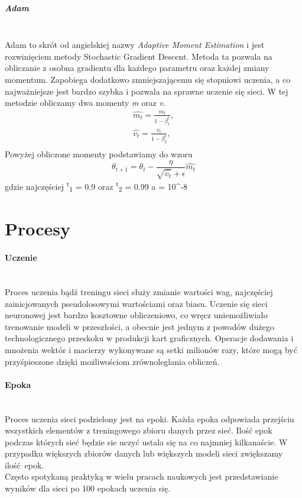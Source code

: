 \subparagraph{Adam} \mbox{}\\
Adam to skrót od angielskiej nazwy \textit{Adaptive Moment Estimation} i jest rozwinięciem
metody Stochastic Gradient Descent. Metoda ta pozwala na obliczanie z osobna gradientu dla
każdego parametru oraz każdej zmiany momentum. Zapobiega dodatkowo zmniejszającemu się
stopniowi uczenia, a co najważniejsze jest bardzo szybka i pozwala na sprawne uczenie
się sieci. W tej metodzie obliczamy dwa momenty \textit{m} oraz \textit{v}.
\begin{equation}
\begin{align*}
\hat{m_t} = \frac{m_t} {1 - \beta^t_1}, \\
\hat{v_t} = \frac{v_t} {1 - \beta^t_2}, \\
\end{align*}
\end{equation}
Powyżej obliczone momenty podstawiamy do wzoru
\begin{equation}
\theta_{t+1} = \theta_t - \frac {\eta} {\sqrt{\hat{v_t}} + \epsilon} \hat{m_t}
\end{equation}
gdzie najczęściej \textbeta \textsuperscript{t}\textsubscript{1} = 0.9 oraz
\textbeta \textsuperscript{t}\textsubscript{2} = 0.99 a \straightepsilon = 10^{-8}\\

\section{Procesy}

\paragraph{Uczenie} \mbox{}\\
Proces uczenia bądź treningu sieci służy zmianie wartości wag, najczęściej zainicjowanych
pseudolosowymi wartościami oraz biasu. Uczenie się sieci neuronowej jest bardzo
kosztowne obliczeniowo, co wręcz uniemożliwiało trenowanie modeli w przeszłości,
a obecnie jest jednym z powodów dużego technologicznego przeskoku w produkcji kart
graficznych. Operacje dodawania i mnożenia wektór i macierzy wykonywane są setki
milionów razy, które mogą być przyśpieszone dzięki możliwościom zrównoleglania obliczeń. \\

\paragraph{Epoka} \mbox{}\\
Proces uczenia sieci podzielony jest na epoki. Każda epoka odpowiada przejściu
wszystkich elementów z treningowego zbioru danych przez sieć. Ilość epok podczas
których sieć będzie sie uczyć ustala się na co najmniej kilkanaście. W przypadku
większych zbiorów danych lub większych modeli sieci zwiększamy ilość epok. \\
Często spotykaną praktyką w wielu pracach naukowych jest przedstawianie wyników
dla sieci po 100 epokach uczenia się.

